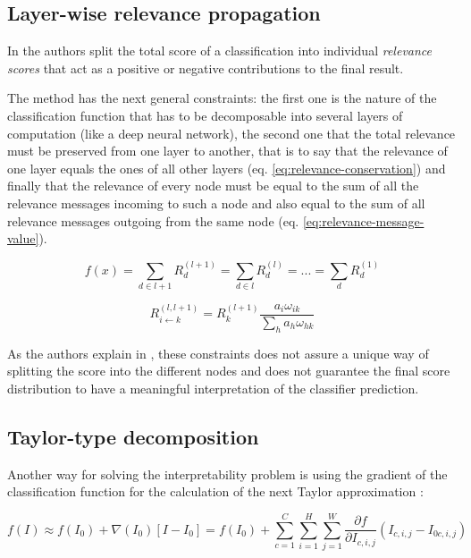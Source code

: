 \documentclass[preprint]{elsarticle}
\theoremstyle{definition} %
\theoremstyle{remark}
\begin{document}
\subsection{Layer-wise relevance propagation} 

In \cite{bach2015pixel} the authors split the total score of a classification into individual \emph{relevance scores} that act as a positive or negative contributions to the final result. 

The method has the next general constraints: the first one is the nature of the classification function that has to be decomposable into several layers of computation (like a deep neural network), the second one that the total relevance must be preserved from one layer to another, that is to say that the relevance of one layer equals the ones of all other layers (eq. \ref{eq:relevance-conservation}) and finally that the relevance of every node must be equal to the sum of all the relevance messages incoming to such a node and also equal to the sum of all relevance messages outgoing from the same node (eq. \ref{eq:relevance-message-value}).

\begin{equation}
	f(x) = \sum_{d \in l+1}R_d^{(l+1)} = \sum_{d \in l}R_d^{(l)} = ... = \sum_{d}R_d^{(1)}
	\label{eq:relevance-conservation}
\end{equation}

\begin{equation}
R_{i \leftarrow k}^{(l,l+1)} = R_k^{(l+1)} \frac{a_i \omega_{ik}}{\sum_{h} a_h \omega_{hk}}
\label{eq:relevance-message-value}
\end{equation}

As the authors explain in \cite{bach2015pixel}, these constraints does not assure a unique way of splitting the score into the different nodes and does not guarantee the final score distribution to have a meaningful interpretation of the classifier prediction.

\subsection{Taylor-type decomposition} 

Another way for solving the interpretability problem is using the gradient of the classification function for the calculation of the next Taylor approximation \cite{bach2015pixel}:

\begin{equation}
f(I) \approx f(I_0) + \nabla(I_0) [ I - I_0] = f(I_0) + \sum_{c=1}^C \sum_{i=1}^{H} \sum_{j=1}^W \frac{\partial f}{\partial I_{c,i,j}}(I_{c,i,j} - I_{0 c, i, j}) 
\label{eq:taylor}
\end{equation}
\end{document}
